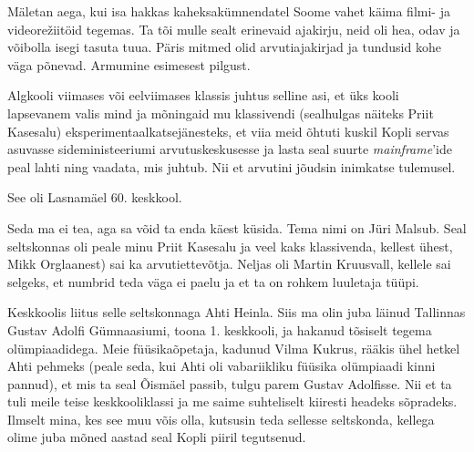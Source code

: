 

Mäletan aega, kui isa hakkas kaheksakümnendatel Soome vahet 
käima filmi- ja videorežiitöid tegemas. Ta tõi mulle sealt erinevaid ajakirju, neid oli 
hea, odav ja võibolla isegi tasuta tuua. Päris mitmed olid 
arvutiajakirjad ja tundusid kohe väga põnevad. Armumine esimesest 
pilgust. 

Algkooli viimases või eelviimases klassis juhtus selline asi, et 
üks kooli lapsevanem valis mind ja mõningaid mu klassivendi (sealhulgas näiteks 
Priit Kasesalu) eksperimentaalkatsejänesteks, et 
viia meid õhtuti kuskil Kopli servas asuvasse sideministeeriumi 
arvutuskeskusesse ja lasta seal 
suurte \emph{mainframe}'ide peal lahti ning vaadata, mis juhtub. Nii et arvutini jõudsin inimkatse 
tulemusel. 


See oli Lasnamäel 60. keskkool.


Seda ma ei tea, aga sa võid ta enda käest küsida. Tema nimi on Jüri 
Malsub. 
Seal seltskonnas oli peale minu Priit Kasesalu ja veel kaks klassivenda, kellest 
ühest, Mikk Orglaanest) sai ka arvutiettevõtja. Neljas 
oli Martin Kruusvall, kellele sai selgeks, et 
numbrid teda väga ei paelu ja et ta on rohkem luuletaja tüüpi.

Keskkoolis liitus selle seltskonnaga Ahti Heinla. Siis 
ma olin juba läinud Tallinnas Gustav Adolfi Gümnaasiumi, toona 1.
keskkooli, ja hakanud tõsiselt tegema 
olümpiaadidega. Meie füüsikaõpetaja, kadunud Vilma Kukrus, rääkis ühel hetkel Ahti pehmeks (peale seda, kui Ahti oli vabariikliku füüsika olümpiaadi 
kinni pannud), et mis ta seal Õismäel passib, tulgu parem 
Gustav Adolfisse. Nii et ta tuli meile teise keskkooliklassi ja me saime suhteliselt kiiresti headeks sõpradeks. Ilmselt mina, kes 
see muu võis olla, kutsusin teda sellesse seltskonda, kellega olime juba 
mõned aastad seal Kopli piiril tegutsenud. 



